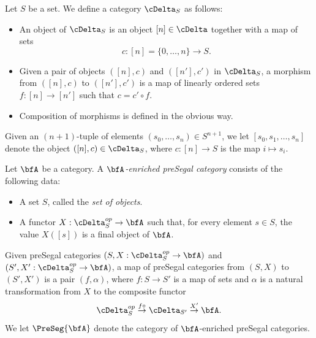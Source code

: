 \begin{definition}
Let $S$ be a set. We define a category $\cDelta_{S}$ as follows:
\begin{itemize}
\item An object of $\cDelta_{S}$ is an object $[n] \in \cDelta$ together with a map of sets
$$ c: [n] = \{ 0, \ldots, n \} \rightarrow S.$$ 
\item Given a pair of objects $([n], c)$ and $([n'], c')$ in $\cDelta_{S}$, a morphism from
$([n], c)$ to $([n'],c')$ is a map of linearly ordered sets $f: [n] \rightarrow [n']$ such that
$c = c' \circ f$.
\item Composition of morphisms is defined in the obvious way.
\end{itemize}
\end{definition}

\begin{notation}
Given an $(n+1)$-tuple of elements $( s_0, \ldots, s_n) \in S^{n+1}$, we let
$[ s_0, s_1, \ldots, s_n ]$ denote the object $( [n], c) \in \cDelta_{S}$, where
$c: [n] \rightarrow S$ is the map $i \mapsto s_i$.
\end{notation}

\begin{definition}
Let $\bfA$ be a category. A {\it $\bfA$-enriched preSegal category} consists of the following data:
\begin{itemize}
\item A set $S$, called the {\it set of objects}.
\item A functor $X: \cDelta_{S}^{op} \rightarrow \bfA$ such that, for every element
$s \in S$, the value $X( [s] )$ is a final object of $\bfA$.
\end{itemize}
Given preSegal categories $(S, X: \cDelta_{S}^{op} \rightarrow \bfA)$ and
$(S', X': \cDelta_{S}^{op} \rightarrow \bfA)$, a map of preSegal categories from
$(S,X)$ to $(S',X')$ is a pair $(f, \alpha)$, where $f: S \rightarrow S'$ is a map of sets and
$\alpha$ is a natural transformation from $X$ to the composite functor
$$ \cDelta^{op}_{S} \stackrel{f \circ }{\rightarrow} \cDelta_{S'} \stackrel{X'}{\rightarrow} \bfA.$$
We let $\PreSeg{\bfA}$ denote the category of $\bfA$-enriched preSegal categories.
\end{definition}


